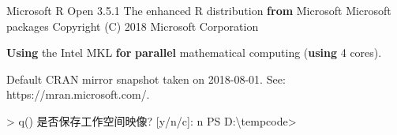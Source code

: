\documentclass[11pt]{ctexart}
\newenvironment{Shaded}{}{}
\newcommand{\KeywordTok}[1]{\textcolor[rgb]{0.00,0.44,0.13}{\textbf{{#1}}}}
\newcommand{\FunctionTok}[1]{\textcolor[rgb]{0.02,0.16,0.49}{{#1}}}
\newcommand{\NormalTok}[1]{{#1}}
\begin{document}
\begin{Shaded}
\begin{Highlighting}[]
\NormalTok{Microsoft }\FunctionTok{R}\NormalTok{ Open 3.}\FunctionTok{5}\NormalTok{.}\FunctionTok{1}
\NormalTok{The enhanced }\FunctionTok{R}\NormalTok{ distribution }\KeywordTok{from}\NormalTok{ Microsoft}
\NormalTok{Microsoft packages Copyright (C) 2018 Microsoft Corporation}

\KeywordTok{Using}\NormalTok{ the Intel MKL }\KeywordTok{for} \KeywordTok{parallel}\NormalTok{ mathematical computing (}\KeywordTok{using}\NormalTok{ 4 cores).}

\NormalTok{Default CRAN mirror snapshot taken on 2018-08-01.}
\NormalTok{See: https://mran.}\FunctionTok{microsoft}\NormalTok{.}\FunctionTok{com}\NormalTok{/.}

\NormalTok{> q()}
\NormalTok{是否保存工作空间映像? [y/n/c]: n}
\FunctionTok{PS}\NormalTok{ D:\textbackslash{}tempcode>}
\end{Highlighting}
\end{Shaded}


    
    
    
    
\end{document}

